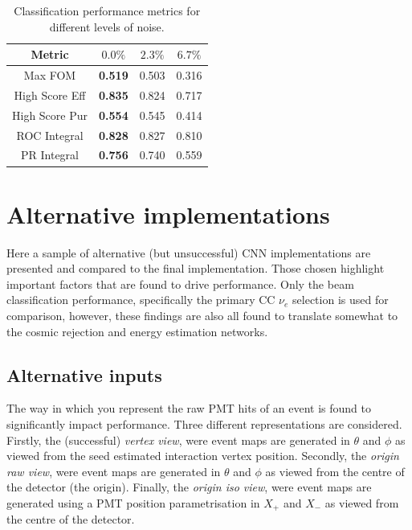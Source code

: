 \begin{table} %
    \begin{tabular}{cccc}
        Metric         & $0.0\%$        & $2.3\%$ & $6.7\%$ \\
        \midrule
        Max FOM        & \textbf{0.519} & 0.503   & 0.316   \\
        High Score Eff & \textbf{0.835} & 0.824   & 0.717   \\
        High Score Pur & \textbf{0.554} & 0.545   & 0.414   \\
        ROC Integral   & \textbf{0.828} & 0.827   & 0.810   \\
        PR Integral    & \textbf{0.756} & 0.740   & 0.559   \\
    \end{tabular}
    \caption[Classification performance metrics for different levels of noise]
    {Classification performance metrics for different levels of noise.}
    \label{tab:calib_time}
\end{table}

\section{Alternative implementations} %
\label{sec:results_alt} %

Here a sample of alternative (but unsuccessful) \chips CNN implementations are presented and
compared to the final implementation. Those chosen highlight important factors that are found to
drive performance. Only the beam classification performance, specifically the primary CC $\nu_{e}$
selection is used for comparison, however, these findings are also all found to translate somewhat
to the cosmic rejection and energy estimation networks.

\subsection*{Alternative inputs} %

The way in which you represent the raw PMT hits of an event is found to significantly impact
performance. Three different representations are considered. Firstly, the (successful)
\emph{vertex view}, were event maps are generated in $\theta$ and $\phi$ as viewed from the seed
estimated interaction vertex position. Secondly, the \emph{origin raw view}, were event maps are
generated in $\theta$ and $\phi$ as viewed from the centre of the detector (the origin). Finally,
the \emph{origin iso view}, were event maps are generated using a PMT position parametrisation in
$X_{+}$ and $X_{-}$ as viewed from the centre of the detector.

